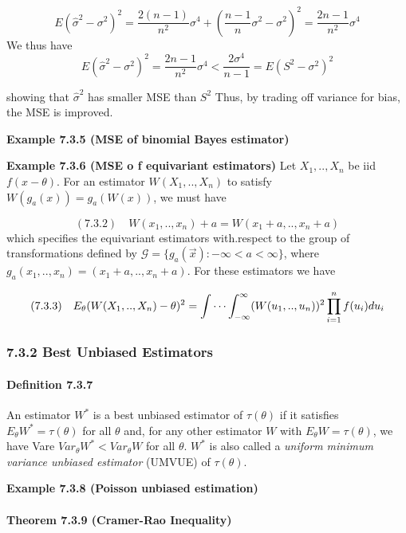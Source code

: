 \documentclass[6pt,Portrait]{article}
\let\oldparagraph\paragraph
\renewcommand{\paragraph}[1]{\oldparagraph{#1}\mbox{}}
\begin{document}
\[E(\hat\sigma^2-\sigma^2)^2=\frac{2(n-1)}{n^2}\sigma^4+\left(\frac{n-1}n\sigma^2-\sigma^2\right)^2=\frac{2n-1}{n^2}\sigma^4\]
We thus have
\[E(\hat\sigma^2-\sigma^2)^2=\frac{2n-1}{n^2}\sigma^4<\frac{2\sigma^4}{n-1}=E(S^2-\sigma^2)^2\]

showing that \(\hat\sigma^2\) has smaller MSE than \(S^2\) Thus, by
trading off variance for bias, the MSE is improved.

\textbf{Example 7.3.5 (MSE of binomial Bayes estimator)}

\textbf{Example 7.3.6 (MSE o f equivariant estimators)} Let
\(X_1,..,X_n\) be iid \(f(x-\theta)\). For an estimator
\(W(X_1,..,X_n)\) to satisfy \(W(g_a(x))=g_a(W(x))\), we must have

\[(7.3.2)\quad W(x_1,..,x_n)+a=W(x_1+a,..,x_n+a)\] which specifies the
equivariant estimators with.respect to the group of transformations
defined by \(\mathcal{G}=\{g_a(\vec x):-\infty<a<\infty\}\), where
\(g_a(x_1,..,x_n)=(x_1+a,..,x_n+a)\). For these estimators we have

\[(7.3.3)\quad E_\theta(W(X_1,..,X_n)-\theta)^2=\idotsint^\infty_{-\infty}(W(u_1,..,u_n))^2\prod^n_{i=1}f(u_i)du_i\]

\hypertarget{best-unbiased-estimators}{%
\subsubsection{7.3.2 Best Unbiased
Estimators}\label{best-unbiased-estimators}}

\hypertarget{UMVUE}{%
\paragraph{\texorpdfstring{\textbf{Definition
7.3.7}}{Definition 7.3.7}}\label{UMVUE}}

An estimator \(W^*\) is a best unbiased estimator of \(\tau(\theta)\) if
it satisfies \(E_\theta{W^*}=\tau(\theta)\) for all \(\theta\) and, for
any other estimator \(W\) with \(E_\theta{W}=\tau(\theta)\), we have
Vare \(Var_\theta{W^*}<Var_\theta{W}\) for all \(\theta\). \(W^*\) is
also called a \emph{uniform minimum variance unbiased estimator} (UMVUE)
of \(\tau(\theta)\).

\textbf{Example 7.3.8 (Poisson unbiased estimation)}

\hypertarget{CRLB}{%
\paragraph{\texorpdfstring{\textbf{Theorem 7.3.9 (Cramer-Rao
Inequality)}}{Theorem 7.3.9 (Cramer-Rao Inequality)}}\label{CRLB}}
\end{document}
